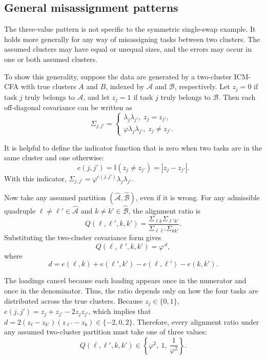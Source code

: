 \documentclass[
  american,
  man,floatsintext]{apa7}
\begin{document}
\subsection{General misassignment patterns}\label{general-misassignment-patterns}

The three-value pattern is not specific to the symmetric single-swap example. It holds more generally for any way of misassigning tasks between two clusters. The assumed clusters may have equal or unequal sizes, and the errors may occur in one or both assumed clusters.

To show this generality, suppose the data are generated by a two-cluster ICM-CFA with true clusters \(A\) and \(B\), indexed by \(\mathcal A\) and \(\mathcal B\), respectively. Let \(z_j=0\) if task \(j\) truly belongs to \(\mathcal A\), and let \(z_j=1\) if task \(j\) truly belongs to \(\mathcal B\). Then each off-diagonal covariance can be written as
\[
\Sigma_{j,j'}= \left\{\begin{array}{cc}
\lambda_j\lambda_{j'}, \;z_j = z_{j'},\\
\varphi\lambda_j\lambda_{j'}, \;z_j \neq z_{j'}.
\end{array}
\right.
\]

It is helpful to define the indicator function that is zero when two tasks are in the same cluster and one otherwise:
\[
e(j,j')= \mathbb{I}(z_j\neq z_{j'}) =|z_j-z_{j'}|.
\]
With this indicator, \(\Sigma_{j,j'} = \varphi^{e(j,j')}\lambda_j\lambda_{j'}\).

Now take any assumed partition \((\widehat{\mathcal A},\widehat{\mathcal B})\), even if it is wrong. For any admissible quadruple \(\ell\neq \ell'\in\widehat{\mathcal A}\) and \(k\neq k'\in\widehat{\mathcal B}\), the alignment ratio is
\[
Q(\ell,\ell',k,k')
=
\frac{\Sigma_{\ell k}\Sigma_{\ell' k'}}
{\Sigma_{\ell\ell'}\Sigma_{kk'}}.
\]
Substituting the two-cluster covariance form gives
\[
Q(\ell,\ell',k,k')
=
\varphi^{\,d},
\]
where
\[
d
=
e(\ell,k)+e(\ell',k')-e(\ell,\ell')-e(k,k').
\]

The loadings cancel because each loading appears once in the numerator and once in the denominator. Thus, the ratio depends only on how the four tasks are distributed across the true clusters. Because \(z_j\in\{0,1\}\), \(e(j,j')=z_j+z_{j'}-2z_jz_{j'}\), which implies that \(d=2(z_\ell-z_{k'})(z_{\ell'}-z_k)\in\{-2,0,2\}\). Therefore, every alignment ratio under any assumed two-cluster partition must take one of three values:
\[
Q(\ell,\ell',k,k')\in
\left\{
\varphi^2,\ 1,\ \frac{1}{\varphi^2}
\right\}.
\]
\end{document}
